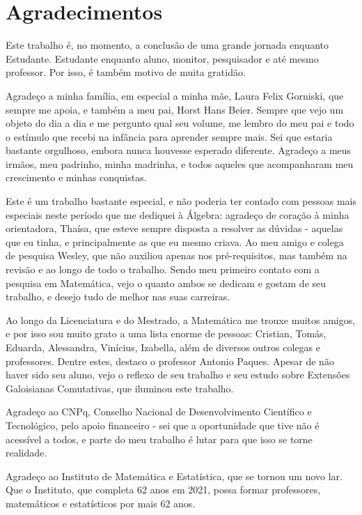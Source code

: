 \documentclass[12pt]{report}
\theoremstyle{definition}
\theoremstyle{remark}
\begin{document}
\chapter*{\center Agradecimentos}
Este trabalho é, no momento, a conclusão de uma grande jornada enquanto Estudante. Estudante enquanto aluno, monitor, pesquisador e até mesmo professor. Por isso, é também motivo de muita gratidão. \par
Agradeço a minha família, em especial a minha mãe, Laura Felix Gorniski, que sempre me apoia, e também a meu pai, Horst Hans Beier. Sempre que vejo um objeto do dia a dia e me pergunto qual seu volume, me lembro do meu pai e todo o estímulo que recebi na infância para aprender sempre mais. Sei que estaria bastante orgulhoso, embora nunca houvesse esperado diferente. Agradeço a meus irmãos, meu padrinho, minha madrinha, e todos aqueles que acompanharam meu crescimento e minhas conquistas. \par
Este é um trabalho bastante especial, e não poderia ter contado com pessoas mais especiais neste período que me dediquei à Álgebra: agradeço de coração à minha orientadora, Thaísa, que esteve sempre disposta a resolver as dúvidas - aquelas que eu tinha, e principalmente as que eu mesmo criava. Ao meu amigo e colega de pesquisa Wesley, que não auxiliou apenas nos pré-requisitos, mas também na revisão e ao longo de todo o trabalho. Sendo meu primeiro contato com a pesquisa em Matemática, vejo o quanto ambos se dedicam e gostam de seu trabalho, e desejo tudo de melhor nas suas carreiras. \par
Ao longo da Licenciatura e do Mestrado, a Matemática me trouxe muitos amigos, e por isso sou muito grato a uma lista enorme de pessoas: Cristian, Tomás, Eduarda, Alessandra, Vinícius, Izabella, além de diversos outros colegas e professores. Dentre estes, destaco o professor Antonio Paques. Apesar de não haver sido seu aluno, vejo o reflexo de seu trabalho e seu estudo sobre Extensões Galoisianas Comutativas, que iluminou este trabalho. \par
Agradeço ao CNPq, Conselho Nacional de Desenvolvimento Científico e Tecnológico, pelo apoio financeiro - sei que a oportunidade que tive não é acessível a todos, e parte do meu trabalho é lutar para que isso se torne realidade. \par
Agradeço ao Instituto de Matemática e Estatística, que se tornou um novo lar. Que o Instituto, que completa 62 anos em 2021, possa formar professores, matemáticos e estatísticos por mais 62 anos.
\end{document}

